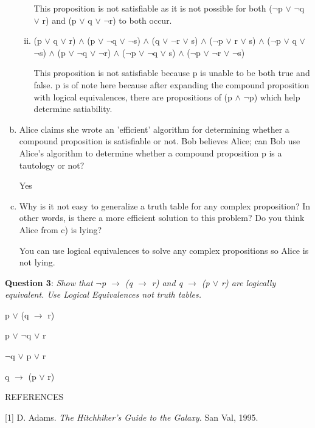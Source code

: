 \documentclass{article} %
\newcommand{\question}[2][]{\begin{flushleft}
        \textbf{Question #1}: \textit{#2}

\end{flushleft}}
\begin{document}
\begin{enumerate}[a.]
\begin{enumerate}[i)]
            This proposition is not satisfiable as it is not possible for both ($\neg$p $\lor$ $\neg$q $\lor$ r) and (p $\lor$ q $\lor$ $\neg$r) to both occur.

            \item {(p $\lor$ q $\lor$ r) $\land$ (p $\lor$ $\neg$q $\lor$ $\neg$s) $\land$ (q  $\lor$ $\neg$r $\lor$ s) $\land$ ($\neg$p $\lor$ r $\lor$ s) $\land$ ($\neg$p $\lor$ q $\lor$ $\neg$s) $\land$ (p $\lor$ $\neg$q $\lor$ $\neg$r) $\land$ ($\neg$p $\lor$ $\neg$q $\lor$ s) $\land$ ($\neg$p $\lor$ $\neg$r $\lor$ $\neg$s)}
            
            This proposition is not satisfiable because p is unable to be both true and false. p is of note here because after expanding the compound proposition with logical equivalences, there are propositions of (p $\land$ $\neg$p) which help determine satiability.
        \end{enumerate}
        \item {Alice claims she wrote an ’efficient’ algorithm for determining whether a compound proposition is satisfiable or not. Bob believes Alice; can Bob use Alice’s algorithm to determine whether a compound
        proposition p is a tautology or not?}

        Yes 

        \item {Why is it not easy to generalize a truth table for any complex proposition? In other words, is there a
        more eﬀicient solution to this problem? Do you think Alice from c) is lying?}

        You can use logical equivalences to solve any complex propositions so Alice is not lying.

    \end{enumerate}

    \question[3] {Show that $\neg$p $\rightarrow$ (q $\rightarrow$ r) and q $\rightarrow$ (p $\lor$ r) are logically equivalent. Use Logical Equivalences not truth tables.}

    p $\lor$ (q $\rightarrow$ r)

    p $\lor$ $\neg$q $\lor$ r

    $\neg$q $\lor$ p $\lor$ r

    q $\rightarrow$ (p $\lor$ r)

    \begin{center}
        REFERENCES
    \end{center}

    [1] D. Adams. \emph{The Hitchhiker’s Guide to the Galaxy.} San Val, 1995.
\end{document}
